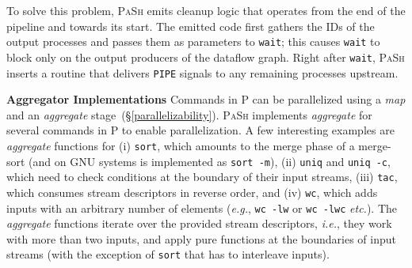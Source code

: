 \documentclass[sigplan, review, screen, anonymous]{acmart}
\newcommand{\eg}{{\em e.g.}, }
\newcommand{\ie}{{\em i.e.}, }
\newcommand{\etc}{{\em etc.}\xspace}
\newcommand{\heading}[1]{\vspace{4pt}\noindent\textbf{#1}\enspace}
\newcommand{\ttt}[1]{\texttt{#1}}
\newcommand{\tcn}[1]{\mbox{\textcircled{\scriptsize #1}}}
\newcommand{\tpur}{\tcn{\textsc{P}}\xspace}
\newcommand{\todo}[1]{\hl{#1}\xspace}
\newcommand{\kk}[1]{[{\color{magenta}kk: #1}]}
\newcommand{\sx}[1]{(\S\ref{#1})}
\newcommand{\sys}{{\scshape PaSh}\xspace}
\begin{document}
To solve this problem, \sys emits cleanup logic that operates from the
end of the pipeline and towards its start.  The emitted code first
gathers the IDs of the output processes and passes them as parameters
to \ttt{wait}; this causes \ttt{wait} to block only on the output
producers of the dataflow graph.  Right after \ttt{wait}, \sys inserts
a routine that delivers \ttt{PIPE} signals to any remaining processes
upstream.




\heading{Aggregator Implementations}
Commands in \tpur can be parallelized using a \emph{map} and an \emph{aggregate} stage~\sx{parallelizability}.
\sys implements \emph{aggregate} for several commands in \tpur to enable parallelization.
A few interesting examples are \emph{aggregate} functions for
  (i) \ttt{sort}, which amounts to the merge phase of a merge-sort (and on GNU systems is implemented as \ttt{sort -m}),
  (ii) \ttt{uniq} and \ttt{uniq -c}, which need to check conditions at the boundary of their input streams,
  (iii) \ttt{tac}, which consumes stream descriptors in reverse order, and 
  (iv) \ttt{wc}, which adds inputs with an arbitrary number of elements (\eg \ttt{wc -lw} or \ttt{wc -lwc} \etc).
The \emph{aggregate} functions iterate over the provided stream descriptors, \ie they work with more than two inputs, and apply pure functions at the boundaries of input streams (with the exception of \ttt{sort} that has to interleave inputs).
\end{document}
